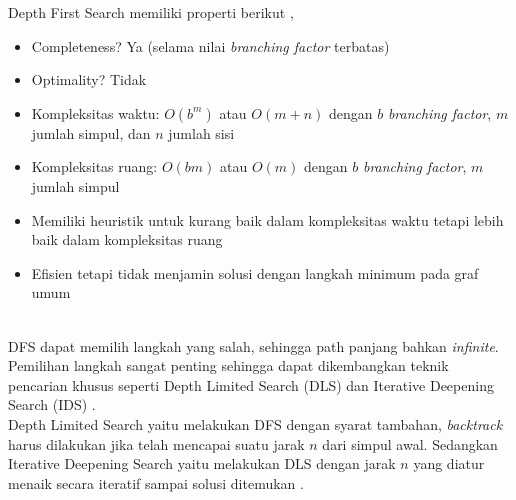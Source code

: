 \documentclass[12pt,a4paper]{article}
\begin{document}
Depth First Search memiliki properti berikut \cite{stima-graph-1} \cite{cp-dfs},
\begin{itemize}
    \item Completeness? Ya (selama nilai \textit{branching factor} terbatas)
    \item Optimality? Tidak
    \item Kompleksitas waktu: $O(b^m)$ atau $O(m + n)$ dengan $b$ \textit{branching factor}, $m$ jumlah simpul, dan $n$ jumlah sisi
    \item Kompleksitas ruang: $O(bm)$ atau $O(m)$ dengan $b$ \textit{branching factor}, $m$ jumlah simpul
    \item Memiliki heuristik untuk kurang baik dalam kompleksitas waktu tetapi lebih baik dalam kompleksitas ruang
    \item Efisien tetapi tidak menjamin solusi dengan langkah minimum pada graf umum
\end{itemize} \\

DFS dapat memilih langkah yang salah, sehingga path panjang bahkan \textit{infinite}. Pemilihan langkah sangat penting sehingga dapat dikembangkan teknik pencarian khusus
seperti Depth Limited Search (DLS) dan Iterative Deepening Search (IDS) \cite{stima-graph-2}. \\

Depth Limited Search yaitu melakukan DFS dengan syarat tambahan, \textit{backtrack} harus dilakukan jika telah mencapai suatu jarak $n$ dari simpul awal. 
Sedangkan Iterative Deepening Search yaitu melakukan DLS
dengan jarak $n$ yang diatur menaik secara iteratif sampai solusi ditemukan \cite{stima-graph-2}. \\
\end{document}

